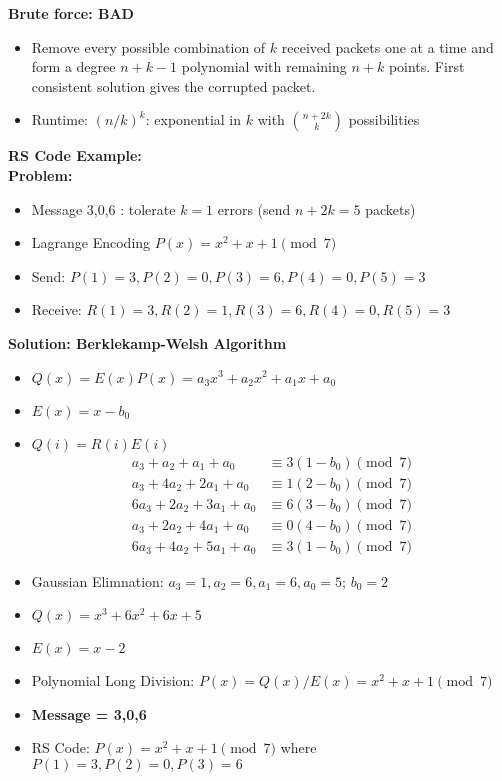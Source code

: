 \documentclass{article}\usepackage{amsmath,amssymb,amsthm,tikz,tkz-graph,color,chngpage,soul,hyperref,csquotes,graphicx,floatrow, listings,polynom}\newcommand*{\QEDB}{\hfill\ensuremath{\square}}\newtheorem*{prop}{Proposition}\renewcommand{\theenumi}{\alph{enumi}}\usepackage[shortlabels]{enumitem}\usepackage[nobreak=true]{mdframed}\usetikzlibrary{matrix,calc}\MakeOuterQuote{"}\usepackage[margin=0.75in]{geometry} \newtheorem{theorem}{Theorem}\newcommand{\Z}{\mathbb Z}\newcommand{\R}{\mathbb R}\newcommand{\Q}{\mathbb Q}\newcommand{\N}{\mathbb N}\newcommand{\x}[1]{\textrm{ #1 }}\newcommand{\pr}{\textrm{Pr}}
\begin{document}
\begin{mdframed}

\textbf{Brute force: BAD}
\begin{itemize}
\item Remove every possible combination of $k$ received packets one at a time and form a degree $n+k-1$ polynomial with remaining $n+k$ points. First consistent solution gives the corrupted packet.
\item Runtime: $(n/k)^k$: exponential in $k$ with $\binom{n+2k}{k}$ possibilities
\end{itemize}
\end{mdframed}

\begin{mdframed}
\textbf{RS Code Example:}\\
\textbf{Problem:}
\begin{itemize}
\item Message 3,0,6 : tolerate $k = 1$ errors (send $n+2k = 5$ packets)
\item Lagrange Encoding $P(x) = x^2 + x + 1 \pmod{7}$
\item Send: $P(1) = 3, P(2) = 0, P(3) = 6, P(4) = 0, P(5) = 3$
\item Receive: $R(1) = 3, R(2) = 1, R(3) = 6, R(4) = 0, R(5) = 3$
\end{itemize}
\textbf{Solution: Berklekamp-Welsh Algorithm}
\begin{itemize}
\item $Q(x) = E(x)P(x) = a_3x^3+a_2x^2+a_1x+a_0$
\item $E(x) = x-b_0$
\item $Q(i) = R(i)E(i)$
\begin{align*}
a_3+a_2+a_1+a_0 & \equiv 3(1-b_0) \pmod{7} \\
a_3+4a_2+2a_1+a_0 & \equiv 1(2-b_0) \pmod{7} \\
6a_3+2a_2+3a_1+a_0 & \equiv 6(3-b_0) \pmod{7} \\
a_3+2a_2+4a_1+a_0 & \equiv 0(4-b_0) \pmod{7} \\
6a_3+4a_2+5a_1+a_0 & \equiv 3(1-b_0) \pmod{7} 
\end{align*}
\item Gaussian Elimnation: $a_3=1, a_2=6, a_1=6, a_0=5$; $b_0=2$
\item $Q(x) = x^3+6x^2+6x+5$
\item $E(x)=x-2$
\item Polynomial Long Division: $P(x) = Q(x)/E(x) = x^2+x+1 \pmod{7}$\\
\item\textbf{Message = 3,0,6}
\item RS Code: $P(x) = x^2 + x + 1 \pmod{7}$ where $P(1) = 3, P(2) = 0, P(3) = 6$
\end{itemize}
\end{mdframed}
\end{document}
